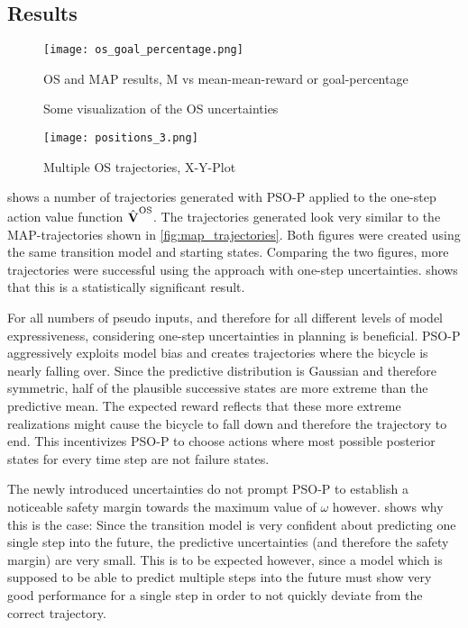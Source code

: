 \subsection{Results}
\begin{figure}[tp]
    \centering
    \texttt{[image: os\_goal\_percentage.png]}
    \caption{OS and MAP results, M vs mean-mean-reward or goal-percentage}
    \label{fig:os_results}
\end{figure}
\begin{figure}[tp]
    \centering
    \caption{Some visualization of the OS uncertainties}
    \label{fig:os_uncertainties}
\end{figure}
\begin{figure}[p]
    \centering
    \texttt{[image: positions\_3.png]}
    \caption{Multiple OS trajectories, X-Y-Plot}
    \label{fig:os_trajectories}
\end{figure}
 shows a number of trajectories generated with PSO-P applied to the one-step action value function $\operatorname{\hat{\operatorname{\mathbf{V}}}}^{\text{OS}}$.
The trajectories generated look very similar to the MAP-trajectories shown in \cref{fig:map_trajectories}.
Both figures were created using the same transition model and starting states.
Comparing the two figures, more trajectories were successful using the approach with one-step uncertainties.
 shows that this is a statistically significant result.

For all numbers of pseudo inputs, and therefore for all different levels of model expressiveness, considering one-step uncertainties in planning is beneficial.
PSO-P aggressively exploits model bias and creates trajectories where the bicycle is nearly falling over.
Since the predictive distribution is Gaussian and therefore symmetric, half of the plausible successive states are more extreme than the predictive mean.
The expected reward reflects that these more extreme realizations might cause the bicycle to fall down and therefore the trajectory to end.
This incentivizes PSO-P to choose actions where most possible posterior states for every time step are not failure states.

The newly introduced uncertainties do not prompt PSO-P to establish a noticeable safety margin towards the maximum value of $\omega$ however.
 shows why this is the case:
Since the transition model is very confident about predicting one single step into the future, the predictive uncertainties (and therefore the safety margin) are very small.
This is to be expected however, since a model which is supposed to be able to predict multiple steps into the future must show very good performance for a single step in order to not quickly deviate from the correct trajectory.

